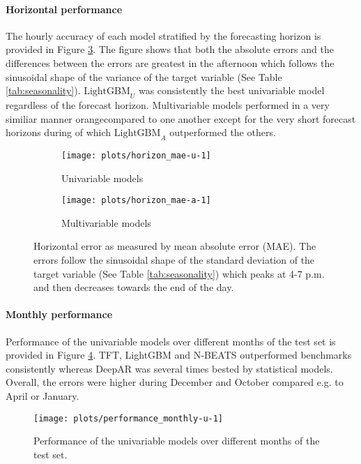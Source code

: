 

\paragraph{Horizontal performance} The hourly accuracy of each model stratified by the forecasting horizon is provided in Figure \ref{fig:horizon_mae}. The figure shows that both the absolute errors and the differences between the errors are greatest in the afternoon which follows the sinusoidal shape of the variance of the target variable (See Table \ref{tab:seasonality}). $\text{LightGBM}_U$ was consistently the best univariable model regardless of the forecast horizon. Multivariable models performed in a very similiar manner orangecompared to one another except for the very short forecast horizons during of which $\text{LightGBM}_A$ outperformed the others.

\begin{figure}[H]
    \centering
    \begin{subfigure}[b]{0.4\textwidth}
        \texttt{[image: plots/horizon\_mae-u-1]}
        \caption{Univariable models}
        \label{fig:horizon_mae-u-1}
    \end{subfigure}
    \begin{subfigure}[b]{0.4\textwidth}
        \texttt{[image: plots/horizon\_mae-a-1]}
        \caption{Multivariable models}
        \label{fig:horizon_mae-a-1}
    \end{subfigure}
    \caption{Horizontal error as measured by mean absolute error (MAE). The errors follow the sinusoidal shape of the standard deviation of the target variable (See Table \ref{tab:seasonality}) which peaks at 4-7 p.m. and then decreases towards the end of the day.}
    \label{fig:horizon_mae}
\end{figure}


\paragraph{Monthly performance} Performance of the univariable models over different months of the test set is provided in Figure \ref{fig:performance_monthly-u}. TFT, LightGBM and N-BEATS outperformed benchmarks consistently whereas DeepAR was several times bested by statistical models. Overall, the errors were higher during December and October compared e.g. to April or January.


\begin{figure}[H]
    \centering
        \texttt{[image: plots/performance\_monthly-u-1]}
        \caption{Performance of the univariable models over different months of the test set.}
        \label{fig:performance_monthly-u}
\end{figure}

